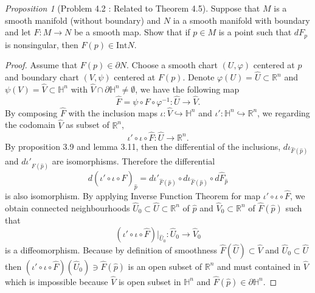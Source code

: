 \documentclass[a4paper]{article}
\theoremstyle{remark}
\newtheorem{prop}{Proposition}
\begin{document}
\begin{prop}[Problem 4.2 \cite{LeeSM} : Related to Theorem 4.5]
Suppose that $M$ is a smooth manifold (without boundary) and $N$ ia a smooth manifold with boundary and let $F : M \rightarrow N$ be a smooth map. Show that if $p\in M$ is a point such that $dF_p$ is nonsingular, then $F(p)\in \text{Int} N$.
\end{prop}
\begin{proof}
Assume that $F(p) \in \partial N$. Choose a smooth chart $(U,\varphi)$ centered at $p$ and boundary chart $(V,\psi)$ centered at $F(p)$. Denote $\varphi(U)=\hat{U} \subset \mathbb{R}^n$ and $\psi(V)=\hat{V} \subset \mathbb{H}^n$ with $\hat{V} \cap \partial \mathbb{H}^n \neq \emptyset$, we have the following map
$$
\hat{F} = \psi \circ F \circ \varphi^{-1} : \hat{U} \rightarrow \hat{V}.
$$
By composing $\hat{F}$ with the inclusion maps $\iota : \hat{V} \hookrightarrow \mathbb{H}^n$ and $\iota' : \mathbb{H}^n \hookrightarrow \mathbb{R}^n$, we regarding the codomain $\hat{V}$ as subset of $\mathbb{R}^n$, 
$$
\iota' \circ \iota \circ \hat{F} : \hat{U} \rightarrow \mathbb{R}^n.
$$
By proposition 3.9 and lemma 3.11, then the differential of the inclusions, $d\iota_{\hat{F}(\hat{p})}$ and $d\iota'_{\hat{F}(\hat{p})}$ are isomorphisms. Therefore the differential
$$
d(\iota' \circ \iota \circ \hat{F})_{\hat{p}} = d\iota'_{\hat{F}(\hat{p})} \circ d\iota_{\hat{F}(\hat{p})} \circ d\hat{F}_{\hat{p}}
$$
is also isomorphism. By applying Inverse Function Theorem for map $\iota' \circ \iota \circ \hat{F}$, we obtain connected neighbourhoods $\hat{U}_0 \subset \hat{U} \subset \mathbb{R}^n$ of $\hat{p}$ and $\hat{V}_0 \subset \mathbb{R}^n$ of $\hat{F}(\hat{p})$ such that 
$$
(\iota' \circ \iota \circ \hat{F})|_{\hat{U}_0} : \hat{U}_0 \rightarrow \hat{V}_0
$$
is a diffeomorphism. Because by definition of smoothness $\hat{F}(\hat{U}) \subset \hat{V}$ and $\hat{U}_0 \subset \hat{U}$ then $(\iota' \circ \iota \circ \hat{F})(\hat{U}_0) \ni \hat{F}(\hat{p})$ is an open subset of $\mathbb{R}^n$ and must contained in $\hat{V}$ which is impossible because $\hat{V}$ is open subset in $\mathbb{H}^n$ and $\hat{F}(\hat{p}) \in \partial \mathbb{H}^n$.
\end{proof}
\end{document}
